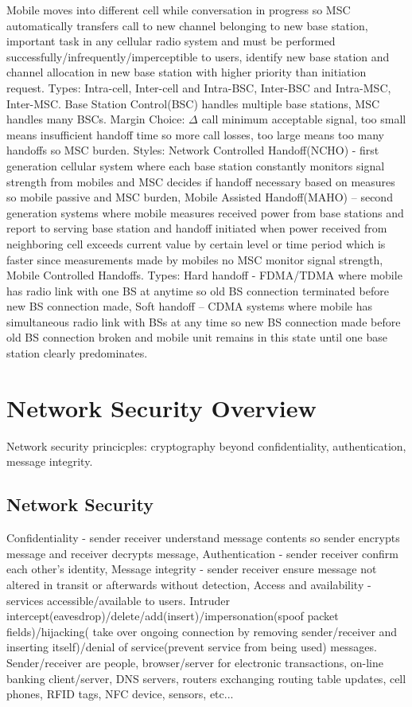 \documentclass[9pt]{extarticle}
\begin{document}
\begin{multicols}{2}
Mobile moves into different cell while conversation in progress so MSC automatically transfers call to new channel belonging to new base station, important task in any cellular radio system and must be performed successfully/infrequently/imperceptible to users, identify new base station and channel allocation in new base station with higher priority than initiation request. Types: Intra-cell, Inter-cell and Intra-BSC, Inter-BSC and Intra-MSC, Inter-MSC. Base Station Control(BSC) handles multiple base stations, MSC handles many BSCs.  Margin Choice: $\Delta$ call minimum acceptable signal, too small means insufficient handoff time so more call losses, too large means too many handoffs so MSC burden. Styles: Network Controlled Handoff(NCHO) - first generation cellular system where each base station constantly monitors signal strength from mobiles and MSC decides if handoff necessary based on measures so mobile passive and MSC burden, Mobile Assisted Handoff(MAHO) – second generation systems where mobile measures received power from  base stations and report to serving base station and handoff initiated when power received from neighboring cell exceeds current value by certain level or time period which is faster since measurements made by mobiles no MSC monitor signal strength, Mobile Controlled Handoffs. Types: Hard handoff - FDMA/TDMA where mobile has radio link with one BS at anytime so old BS connection terminated before new BS connection made, Soft handoff – CDMA systems where mobile has simultaneous radio link with BSs at any time so new BS connection made before old BS connection broken and mobile unit remains in this state until one base station clearly predominates.

\section{Network Security Overview}

Network security princicples: cryptography beyond confidentiality, authentication, message integrity.

\subsection{Network Security}

Confidentiality - sender receiver understand message contents so sender encrypts message and receiver decrypts message, Authentication - sender receiver confirm each other's identity, Message integrity - sender receiver ensure message not altered in transit or afterwards without detection, Access and availability - services accessible/available to users. Intruder intercept(eavesdrop)/delete/add(insert)/impersonation(spoof packet fields)/hijacking( take over ongoing connection by removing sender/receiver and inserting itself)/denial of service(prevent service from being used) messages. Sender/receiver are people, browser/server for electronic transactions, on-line banking client/server, DNS servers, routers exchanging routing table updates, cell phones, RFID tags, NFC device, sensors, etc...


\end{multicols}
\end{document}
